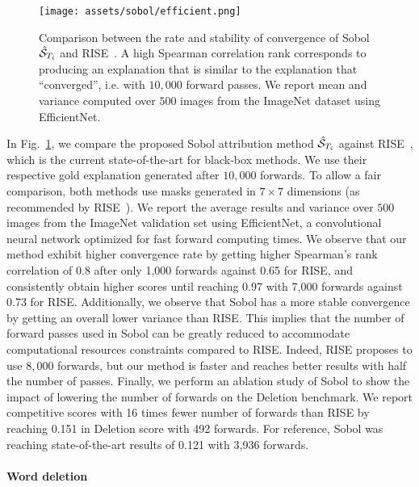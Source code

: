\begin{figure*}
  \centering
    \texttt{[image: assets/sobol/efficient.png]}
  \caption{
  Comparison between the rate and stability of convergence of Sobol $\hat{\mathcal{S}}_{T_i}$ and RISE~\cite{petsiuk2018rise}.
  A high Spearman correlation rank corresponds to producing an explanation that is similar to the explanation that ``converged'', i.e. with $10,000$ forward passes.
  We report mean and variance computed over $500$ images from the ImageNet dataset using EfficientNet.
  } \label{fig:convergence_efficient}
\end{figure*}

In Fig.~\ref{fig:convergence_efficient}, we compare the proposed Sobol attribution method $\hat{\mathcal{S}}_{T_i}$ against RISE~\cite{petsiuk2018rise}, which is the current state-of-the-art for black-box methods.
We use their respective gold explanation generated after $10,000$ forwards. To allow a fair comparison, both methods use masks generated in $7\times7$ dimensions (as recommended by RISE~\cite{petsiuk2018rise}).
We report the average results and variance over $500$ images from the ImageNet validation set using EfficientNet, a convolutional neural network optimized for fast forward computing times.
We observe that our method exhibit higher convergence rate by getting higher Spearman's rank correlation of 0.8 after only 1,000 forwards against 0.65 for RISE, and consistently obtain higher scores until reaching 0.97 with 7,000 forwards against 0.73 for RISE. Additionally, we observe that Sobol has a more stable convergence by getting an overall lower variance than RISE. This implies that the number of forward passes used in Sobol can be greatly reduced to accommodate computational resources constraints compared to RISE. Indeed, RISE proposes to use $8,000$ forwards, but our method is faster and reaches better results with half the number of passes.
Finally, we perform an ablation study of Sobol to show the impact of lowering the number of forwards on the Deletion benchmark. We report competitive scores with 16 times fewer number of forwards than RISE by reaching 0.151 in Deletion score with 492 forwards. For reference, Sobol was reaching state-of-the-art results of 0.121 with 3,936 forwards.

\paragraph{Word deletion}

